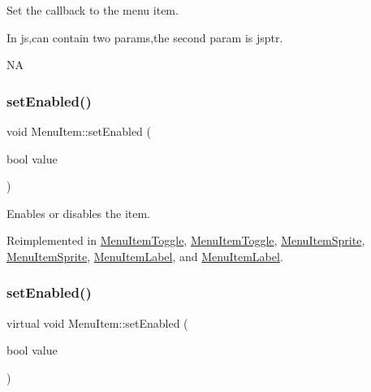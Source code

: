Set the callback to the menu item. 
\begin{DoxyCode}
In js,can contain two params,the second param is jsptr.
\end{DoxyCode}
  NA \mbox{\label{classMenuItem_abe370fd6258192233b6bd9534344773b}} 
\subsubsection{\texorpdfstring{set\+Enabled()}{setEnabled()}\hspace{0.1cm}{\footnotesize\ttfamily [1/2]}}
{\footnotesize\ttfamily void Menu\+Item\+::set\+Enabled (\begin{DoxyParamCaption}\item[{bool}]{value }\end{DoxyParamCaption})\hspace{0.3cm}{\ttfamily [virtual]}}

Enables or disables the item. 

Reimplemented in \hyperlink{classMenuItemToggle_a987bb7ee9e97fb698aafebe74a86fd76}{Menu\+Item\+Toggle}, \hyperlink{classMenuItemToggle_a12277b632426398004b6588995e6d850}{Menu\+Item\+Toggle}, \hyperlink{classMenuItemSprite_ae64b755275632b2c8f4bae41a6b23287}{Menu\+Item\+Sprite}, \hyperlink{classMenuItemSprite_a09946218901edb83c5ba363d1029b61d}{Menu\+Item\+Sprite}, \hyperlink{classMenuItemLabel_afec86371e192df5410720aeb94cbc12e}{Menu\+Item\+Label}, and \hyperlink{classMenuItemLabel_a7297a6a7bf9e8f84d6cc783d4604adfd}{Menu\+Item\+Label}.

\mbox{\label{classMenuItem_ac7bf0c009319b077ee6f34ee6b83ae03}} 
\subsubsection{\texorpdfstring{set\+Enabled()}{setEnabled()}\hspace{0.1cm}{\footnotesize\ttfamily [2/2]}}
{\footnotesize\ttfamily virtual void Menu\+Item\+::set\+Enabled (\begin{DoxyParamCaption}\item[{bool}]{value }\end{DoxyParamCaption})\hspace{0.3cm}{\ttfamily [virtual]}}

